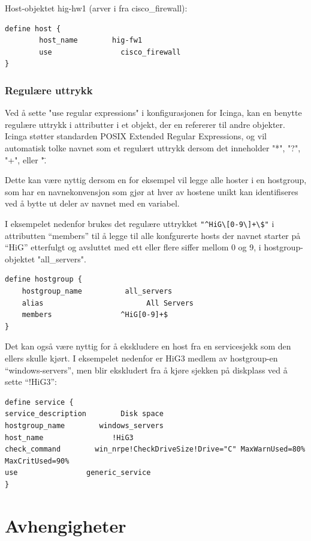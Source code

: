 Host-objektet hig-hw1 (arver i fra cisco\_firewall):

\begin{lstlisting}
define host {
        host_name        hig-fw1
        use                cisco_firewall
}
\end{lstlisting}

\subsubsection{Regulære uttrykk}
Ved å sette "use regular expressions" i konfigurasjonen for Icinga, kan en benytte regulære uttrykk i attributter i et objekt, der en refererer til andre objekter. Icinga støtter standarden POSIX Extended Regular Expressions, og vil automatisk tolke navnet som et regulært uttrykk dersom det inneholder "*", "?", "+", eller "\".

Dette kan være nyttig dersom en for eksempel vil legge alle hoster i en hostgroup, som har en navnekonvensjon som gjør at hver av hostene unikt kan identifiseres ved å bytte ut deler av navnet med en variabel.

I eksempelet nedenfor brukes det regulære uttrykket \verb|"^HiG\[0-9\]+\$"| i attributten “members” til å legge til alle konfgurerte hosts der navnet starter på “HiG” etterfulgt og avsluttet med ett eller flere siffer mellom 0 og 9, i hostgroup-objektet "all\_servers".

\begin{lstlisting}
define hostgroup {
	hostgroup_name          all_servers
	alias                        All Servers
	members                ^HiG[0-9]+$
}
\end{lstlisting}

Det kan også være nyttig for å ekskludere en host fra en servicesjekk som den ellers skulle kjørt. I eksempelet nedenfor er HiG3 medlem av hostgroup-en “windows-servers”, men blir ekskludert fra å kjøre sjekken på diskplass ved å sette “!HiG3”:

\begin{lstlisting}
define service {
service_description        Disk space
hostgroup_name        windows_servers
host_name                !HiG3
check_command        win_nrpe!CheckDriveSize!Drive="C" MaxWarnUsed=80% MaxCritUsed=90%
use                generic_service
}
\end{lstlisting}

\section{Avhengigheter}

